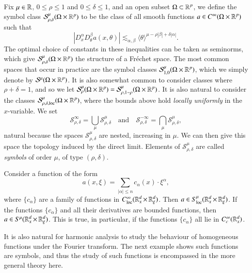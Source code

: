 Fix $\mu \in \operatorname{\mathbb{R}}$, $0 \leq \rho \leq 1$ and $0 \leq \delta \leq 1$, and an open subset $\Omega \subset \operatorname{\mathbb{R}}^p$, we define the symbol class $\mathcal{S}^\mu_{\rho,\delta}(\Omega \times \operatorname{\mathbb{R}}^p)$ to be the class of all smooth functions $a \in C^\infty(\Omega \times \operatorname{\mathbb{R}}^p)$ such that
%
\[ |D^\alpha_x D^\beta_\theta a(x,\theta)| \lesssim_{\alpha,\beta} \langle \theta \rangle^{\mu - \rho |\beta| + \delta |\alpha|}. \]
%
The optimal choice of constants in these inequalities can be taken as seminorms, which give $\mathcal{S}^\mu_{\rho,\delta}(\Omega \times \operatorname{\mathbb{R}}^p)$ the structure of a Fr\'{e}chet space. The most common spaces that occur in practice are the symbol classes $\mathcal{S}^\mu_{1,0}(\Omega \times \operatorname{\mathbb{R}}^p)$, which we simply denote by $\mathcal{S}^\mu(\Omega \times \operatorname{\mathbb{R}}^p)$. It is also somewhat common to consider classes where $\rho + \delta = 1$, and so we let $\mathcal{S}^\mu_\rho(\Omega \times \operatorname{\mathbb{R}}^p) = \mathcal{S}^\mu_{\rho,1-\rho}(\Omega \times \operatorname{\mathbb{R}}^p)$. It is also natural to consider the classes $\mathcal{S}^\mu_{\rho,\delta,\text{loc}}(\Omega \times \operatorname{\mathbb{R}}^p)$, where the bounds above hold \emph{locally uniformly} in the $x$-variable. We set
%
\[ \mathcal{S}^\infty_{\rho,\delta} = \bigcup_\mu \mathcal{S}^\mu_{\rho,\delta} \quad\text{and}\quad \mathcal{S}^{-\infty}_{\rho,\delta} = \bigcap_\mu \mathcal{S}^\mu_{\rho,\delta}, \]
%
natural because the spaces $\mathcal{S}^\mu_{\rho,\delta}$ are nested, increasing in $\mu$. We can then give this space the topology induced by the direct limit. Elements of $\mathcal{S}^\mu_{\rho,\delta}$ are called \emph{symbols} of order $\mu$, of type $(\rho,\delta)$.

\begin{example}
    Consider a function of the form
    \[ a(x,\xi) = \sum_{|\alpha| \leq n} c_\alpha(x) \cdot \xi^\alpha, \]
    where $\{ c_\alpha \}$ are a family of functions in $C^\infty_{\text{loc}}(\operatorname{\mathbb{R}}^d_x \times \operatorname{\mathbb{R}}^d_\xi)$. Then $a \in S^\mu_{\text{loc}}(\operatorname{\mathbb{R}}^d_x \times \operatorname{\mathbb{R}}^d_\xi)$. If the functions $\{ c_\alpha \}$ and all their derivatives are bounded functions, then $a \in S^\mu(\operatorname{\mathbb{R}}^d_x \times \operatorname{\mathbb{R}}^d_\xi)$. This is true, in particular, if the functions $\{ c_\alpha \}$ all lie in $C_c^\infty(\operatorname{\mathbb{R}}^d_x)$.
\end{example}

It is also natural for harmonic analysis to study the behaviour of homogeneous functions under the Fourier transform. The next example shows such functions are symbols, and thus the study of such functions is encompassed in the more general theory here.

